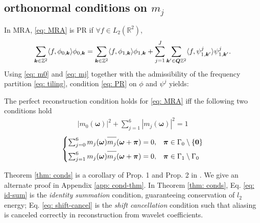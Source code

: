 \subsection{orthonormal conditions on $m_j$}\label{subsec: northonormal cond}
In MRA, \eqref{eq: MRA} is PR if $\forall f\in L_2(\mathbb{R}^2)$,
\begin{equation}
\sum_{\boldsymbol{k}\in\mathbb{Z}^2}\langle f,\phi_{0,\boldsymbol{k}}\rangle\phi_{0,\boldsymbol{k}} = \sum_{\boldsymbol{k}\in\mathbb{Z}^2}\langle f,\phi_{1,\boldsymbol{k}}\rangle\phi_{1,\boldsymbol{k}} + \sum_{j=1}^J\sum_{\boldsymbol{k}'\in\boldsymbol{Q}\mathbb{Z}^2}\langle f,\psi^{j}_{1,\boldsymbol{k}'}\rangle\psi^j_{1,\boldsymbol{k}'}.\label{eq: PR}
\end{equation}
Using \eqref{eq: m0} and \eqref{eq: mj} together with the admissibility of the frequency partition \eqref{eq: tiling}, condition \eqref{eq: PR} on $\phi$ and $\psi^j$ yields:
\begin{thm}\label{thm: conds}
The perfect reconstruction condition holds for \eqref{eq: MRA} iff the following two conditions hold
\begin{align}\label{eq: id-sum}
|m_0(\boldsymbol{\omega})|^2 + \sum_{j = 1}^6|m_j(\boldsymbol{\omega})|^2 = 1
\end{align}
\begin{equation}\label{eq: shift-cancel}
 \begin{cases}
\sum_{j = 0}^6m_j(\boldsymbol{\omega})\overlinespace{m_j}(\boldsymbol{\omega} + \boldsymbol{\pi}) = 0, & \boldsymbol{\pi}\in \Gamma_0\setminus\{\boldsymbol{0}\}\\[.5em]
\sum_{j=1}^6m_j(\boldsymbol{\omega})\overlinespace{m_j}(\boldsymbol{\omega}+\boldsymbol{\pi}) = 0, & \boldsymbol{\pi}\in\Gamma_1\setminus\Gamma_0
\end{cases}
\end{equation}
\end{thm}

Theorem \ref{thm: conds} is a corollary of Prop. 1 and Prop. 2 in \cite{durand2007}. We give an alternate proof in Appendix \ref{app: cond-thm}.
In Theorem \ref{thm: conds}, Eq. \eqref{eq: id-sum} is the {\it identity summation} condition, guaranteeing conservation of $l_2$ energy; Eq. \eqref{eq: shift-cancel} is the {\it shift cancellation} condition such that aliasing is canceled correctly in reconstruction from wavelet coefficients. %

